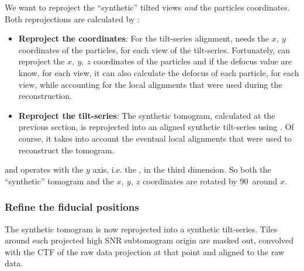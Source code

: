 We want to reproject the ``synthetic'' tilted views \emph{and} the particles coordinates. Both reprojections are calculated by {\tilt}:
\begin{itemize}
    \item \textbf{Reproject the coordinates}: For the tilt-series alignment, {\tiltalign} needs the $x,\ y$ coordinates of the particles, for each view of the tilt-series. Fortunately, {\tilt} can reproject the $x,\ y,\ z$ coordinates of the particles and if the defocus value are know, for each view, it can also calculate the defocus of each particle, for each view, while accounting for the local alignments that were used during the reconstruction.
    
    \item \textbf{Reproject the tilt-series}: The synthetic tomogram, calculated at the previous section, is reprojected into an aligned synthetic tilt-series using {\tilt}. Of course, it takes into account the eventual local alignments that were used to reconstruct the tomogram.
\end{itemize}

\begin{note}{\tilt} and {\tiltalign} operates with the $y$ axis, i.e. the , in the third dimension. So both the ``synthetic'' tomogram and the $x,\ y,\ z$ coordinates are rotated by 90\textdegree\ around $x$.
\end{note}



\subsubsection{Refine the fiducial positions}

The synthetic tomogram is now reprojected into a synthetic tilt-series. Tiles around each projected high SNR subtomogram origin are masked out, convolved with the CTF of the raw data projection at that point and aligned to the raw data.


